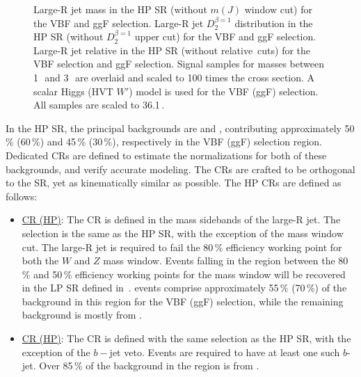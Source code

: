 \begin{figure}[tbp]
\caption[Large-R jet distributions in the high purity signal regions]{Large-R jet mass in the HP SR (without $m(J)$ window cut) for the \protect{} VBF and \protect{} ggF selection. Large-R jet $D_2^{\beta=1}$ distribution in the HP SR (without $D_2^{\beta=1}$ upper cut) for the  \protect{} VBF and \protect{} ggF selection. Large-R jet relative \pT in the HP SR (without relative \pT cuts) for the \protect{}VBF selection and \protect{} ggF selection. Signal samples for masses between 1\,\TeV\, and 3\,\TeV\, are overlaid and scaled to 100 times the cross section. A scalar Higgs (HVT $W'$) model is used for the VBF (ggF) selection. All samples are scaled to 36.1\,\ifb.}
\label{fig:evt_sigbkg_hp}
\end{figure}

In the HP SR, the principal backgrounds are \Wjets and \ttbar, contributing approximately 50\,\% (60\,\%) and 45\,\% (30\,\%), respectively in the VBF (ggF) selection region. Dedicated CRs are defined to estimate the normalizations for both of these backgrounds, and verify accurate modeling. The CRs are crafted to be orthogonal to the SR, yet as kinematically similar as possible. The HP CRs are defined as follows:
\begin{itemize}
\item\underline{\Wjets CR (HP)}: The \Wjets CR is defined in the mass sidebands of the large-R jet. The selection is the same as the HP SR, with the exception of the mass window cut. The large-R jet is required to fail the 80\,\% efficiency working point for both the $W$ and $Z$ mass window. Events falling in the region between the 80\,\% and 50\,\% efficiency working points for the mass window will be recovered in the LP SR defined in~\Sect{\ref{ch:evt_sel:lp}}. \Wjets events comprise approximately 55\,\% (70\,\%) of the background in this region for the VBF (ggF) selection, while the remaining background is mostly from \ttbar.
\item\underline{\ttbar CR (HP)}: The \ttbar CR is defined with the same selection as the HP SR, with the exception of the $b-$jet veto. Events are required to have at least one such $b$-jet. Over 85\,\% of the background in the region is from \ttbar. 
\end{itemize}


